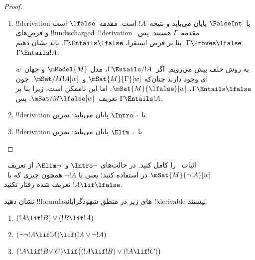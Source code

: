 \documentclass[../../../include/open-logic-section]{subfiles}
\begin{document}
\begin{proof}
\begin{enumerate}
    فرض کنید~$\mSat{M}{\Gamma \cup \Delta}[w]$. چون
    $\mSat{M}{\Gamma}[w]$ و~$\Gamma \Entails !B \lif !C$،
    $\mSat{M}{!B \lif !C}[w]$. بنا بر تعریف، این یعنی برای هر~$w'$
    با~$Rww'$، اگر~$\mSat{M}{!B}[w']$، آنگاه~$\mSat{M}{!C}[w']$.
    چون~$R$ بازتابی است، $w$ یکی از~$w'$هایی است که~$Rww'$؛ یعنی اگر
    $\mSat{M}{!B}[w]$، آنگاه~$\mSat{M}{!C}[w]$. چون
    $\mSat{M}{\Delta}[w]$ و~$\Delta \Entails !B$،
    $\mSat{M}{!B}[w]$. پس، چنان‌که می‌خواستیم، $\mSat{M}{!C}[w]$.

  \item !!{derivation} با~$\FalseInt$ پایان می‌یابد و نتیجه~$!A$ است.
    مقدمه~$\lfalse$ است و فرض‌های !!{undischarged}~!!{derivation}
    مقدمه~$\Gamma$ هستند. پس~$\Gamma \Proves \lfalse$. بنا بر فرض
    استقرا، $\Gamma \Entails \lfalse$. باید نشان دهیم
    $\Gamma \Entails !A$.

    به روش خلف پیش می‌رویم. اگر~$\Gamma \Entails/ !A$، مدل
    $\mModel{M}$ و جهان~$w$ای وجود دارند چنان‌که
    $\mSat{M}{\Gamma}[w]$ و~$\mSat/{M}{!A}[w]$. چون
    $\Gamma \Entails \lfalse$، $\mSat{M}{\lfalse}[w]$. اما این ناممکن
    است، زیرا بنا بر تعریف~$\mSat/{M}{\lfalse}[w]$. پس
    $\Gamma \Entails !A$.
  \item !!{derivation} با~$\Intro\lnot$ پایان می‌یابد: تمرین.
  \item !!{derivation} با~$\Elim\lnot$ پایان می‌یابد: تمرین.
  \end{enumerate}
\end{proof}

\begin{prob}
  اثبات~ را کامل کنید. در حالت‌های
  $\Intro\lnot$ و~$\Elim\lnot$، از تعریف~$\mSat{M}{\lnot !A}[w]$ در
   استفاده کنید؛ یعنی با
  $\lnot !A$ همچون چیزی که با~$!A \lif \lfalse$ تعریف شده رفتار نکنید.
\end{prob}

\begin{prob}
  نشان دهید !!{formula}های زیر در منطق شهودگرایانه !!{derivable}
  نیستند:
  \begin{enumerate}
    \item $(!A \lif !B) \lor (!B \lif !A)$
    \item $(\lnot\lnot !A \lif !A) \lif (!A \lor \lnot !A)$
    \item $(!A \lif !B \lor !C) \lif \bigl((!A \lif !B)\lor(!A \lif !C)\bigr)$
  \end{enumerate}
\end{prob}
\end{document}
